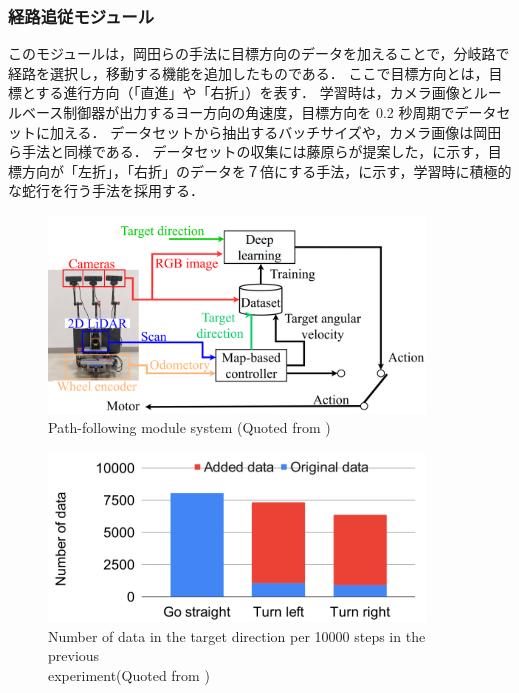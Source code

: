 \clearpage
\subsubsection{経路追従モジュール}
このモジュールは，岡田らの手法に目標方向のデータを加えることで，分岐路で経路を選択し，移動する機能を追加したものである．
ここで目標方向とは，目標とする進行方向（「直進」や「右折」）を表す．
学習時は，カメラ画像とルールベース制御器が出力するヨー方向の角速度，目標方向を 0.2 秒周期でデータセットに加える．
データセットから抽出するバッチサイズや，カメラ画像は岡田ら手法と同様である．
データセットの収集には藤原ら\cite{fujiwara2023}が提案した，に示す，目標方向が「左折」，「右折」のデータを７倍にする手法，に示す，学習時に積極的な蛇行を行う手法を採用する．

\begin{figure}[htbp]
  \centering
  \includegraphics[width=100mm]{images/pdf/haruyama/pathfollow_sys.pdf}
  \caption[Path-following module system]{Path-following module system (Quoted from \cite{haruyama2023})}
  \label{fig:pathfollow}
\end{figure}

\begin{figure}[htbp]
  \centering
  \includegraphics[width=100mm]{images/pdf/fujiwara/oversample.pdf}
  \caption[Number of data in the target direction per 10000 steps in the previous experiment]{Number of data in the target direction per 10000 steps in the previous \\
  experiment(Quoted from \cite{fujiwara2023})}
  \label{fig:oversample}
\end{figure}

